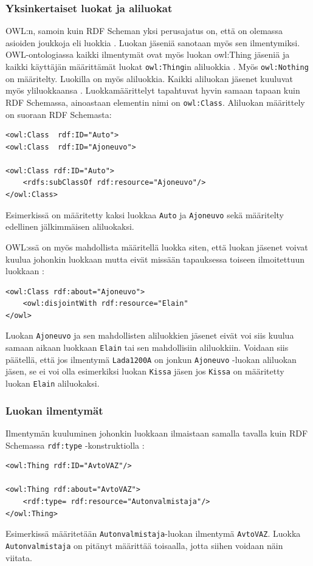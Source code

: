 \documentclass[finnish]{tktltiki2}
\theoremstyle{definition}
\theoremstyle{remark}
\begin{document}
\subsubsection{Yksinkertaiset luokat ja aliluokat}
OWL:n, samoin kuin RDF Scheman yksi perusajatus on, että on olemassa asioiden joukkoja eli luokkia \cite{SWM04}. Luokan jäseniä sanotaan myös sen ilmentymiksi. OWL-ontologiassa kaikki ilmentymät ovat myös luokan owl:Thing jäseniä ja kaikki käyttäjän määrittämät luokat \texttt{owl:Thing}in aliluokkia \cite{SWM04}. Myös \texttt{owl:Nothing} on määritelty. Luokilla on myös aliluokkia. Kaikki aliluokan jäsenet kuuluvat myös yliluokkaansa \cite{SWM04}. Luokkamäärittelyt tapahtuvat hyvin samaan tapaan kuin RDF Schemassa, ainoastaan elementin nimi on \texttt{owl:Class}. Aliluokan määrittely on suoraan RDF Schemasta:
\begin{verbatim}
<owl:Class  rdf:ID="Auto">
<owl:Class  rdf:ID="Ajoneuvo">

<owl:Class rdf:ID="Auto">
    <rdfs:subClassOf rdf:resource="Ajoneuvo"/>
</owl:Class>
\end{verbatim}
Esimerkissä on määritetty kaksi luokkaa \texttt{Auto} ja \texttt{Ajoneuvo} sekä määritelty edellinen jälkimmäisen aliluokaksi. 

OWL:ssä on myös mahdollista määritellä luokka siten, että luokan jäsenet voivat kuulua johonkin luokkaan mutta eivät missään tapauksessa toiseen ilmoitettuun luokkaan \cite{SWM04}:
\begin{verbatim}
<owl:Class rdf:about="Ajoneuvo">
    <owl:disjointWith rdf:resource="Elain"
</owl>
\end{verbatim}
Luokan \texttt{Ajoneuvo} ja sen mahdollisten aliluokkien jäsenet eivät voi siis kuulua samaan aikaan luokkaan \texttt{Elain} tai sen mahdollisiin aliluokkiin. Voidaan siis päätellä, että jos ilmentymä \texttt{Lada1200A} on jonkun \texttt{Ajoneuvo} -luokan aliluokan jäsen, se ei voi olla esimerkiksi luokan \texttt{Kissa} jäsen jos \texttt{Kissa} on määritetty luokan \texttt{Elain} aliluokaksi.

\subsubsection{Luokan ilmentymät}
Ilmentymän kuuluminen johonkin luokkaan ilmaistaan samalla tavalla kuin RDF Schemassa \texttt{rdf:type} -konstruktiolla \cite{SWM04}:
\begin{verbatim}
<owl:Thing rdf:ID="AvtoVAZ"/>

<owl:Thing rdf:about="AvtoVAZ">
    <rdf:type= rdf:resource="Autonvalmistaja"/>
</owl:Thing>
\end{verbatim} 
Esimerkissä määritetään \texttt{Autonvalmistaja}-luokan ilmentymä \texttt{AvtoVAZ}. Luokka \texttt{Autonvalmistaja} on pitänyt määrittää toisaalla, jotta siihen voidaan näin viitata. 
\end{document}
